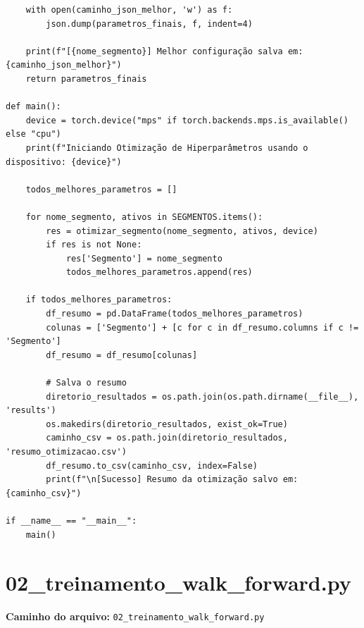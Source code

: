 \documentclass{article}
\begin{document}
\begin{verbatim}
    with open(caminho_json_melhor, 'w') as f:
        json.dump(parametros_finais, f, indent=4)
        
    print(f"[{nome_segmento}] Melhor configuração salva em: {caminho_json_melhor}")
    return parametros_finais

def main():
    device = torch.device("mps" if torch.backends.mps.is_available() else "cpu")
    print(f"Iniciando Otimização de Hiperparâmetros usando o dispositivo: {device}")
    
    todos_melhores_parametros = []
    
    for nome_segmento, ativos in SEGMENTOS.items():
        res = otimizar_segmento(nome_segmento, ativos, device)
        if res is not None:
            res['Segmento'] = nome_segmento
            todos_melhores_parametros.append(res)
            
    if todos_melhores_parametros:
        df_resumo = pd.DataFrame(todos_melhores_parametros)
        colunas = ['Segmento'] + [c for c in df_resumo.columns if c != 'Segmento']
        df_resumo = df_resumo[colunas]
        
        # Salva o resumo
        diretorio_resultados = os.path.join(os.path.dirname(__file__), 'results')
        os.makedirs(diretorio_resultados, exist_ok=True)
        caminho_csv = os.path.join(diretorio_resultados, 'resumo_otimizacao.csv')
        df_resumo.to_csv(caminho_csv, index=False)
        print(f"\n[Sucesso] Resumo da otimização salvo em: {caminho_csv}")

if __name__ == "__main__":
    main()
\end{verbatim}

\newpage

\section{02\_treinamento\_walk\_forward.py}
\textbf{Caminho do arquivo:} \texttt{02\_treinamento\_walk\_forward.py}
\end{document}
